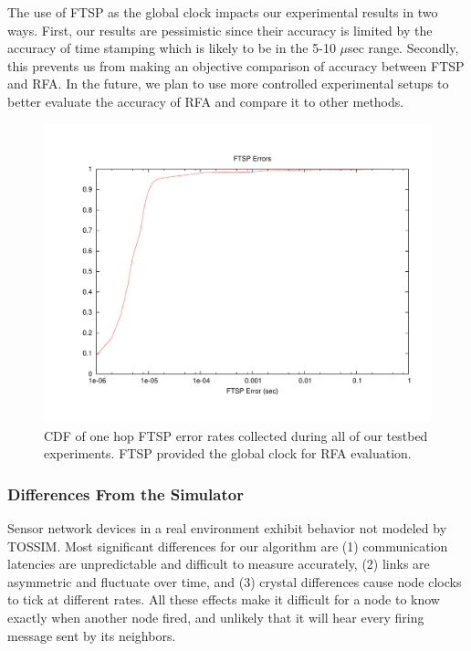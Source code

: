The use of FTSP as the global clock impacts our experimental results
in two ways. First, our results are pessimistic since their accuracy
is limited by the accuracy of time stamping which is likely to be in
the 5-10 $\mu$sec range. Secondly, this prevents us from making an
objective comparison of accuracy between FTSP and RFA. In the future,
we plan to use more controlled experimental setups to better evaluate
the accuracy of RFA and compare it to other methods.

\begin{figure}
\begin{center}
\includegraphics[width=0.8\hsize]{./figures/FTSPERROR.pdf}
\end{center}
\caption {CDF of one hop FTSP error rates collected during all of our
testbed experiments. FTSP provided the global clock for RFA
evaluation.}
\label{FTSP-errors}
\end{figure}


\subsubsection{Differences From the Simulator}
\label{simulator-differences}

Sensor network devices in a real environment exhibit behavior not
modeled by TOSSIM.  Most significant differences for our algorithm are
(1) communication latencies are unpredictable and difficult to measure
accurately, (2) links are asymmetric and fluctuate over time, and (3)
crystal differences cause node clocks to tick at different rates. All
these effects make it difficult for a node to know exactly when
another node fired, and unlikely that it will hear every firing
message sent by its neighbors.

